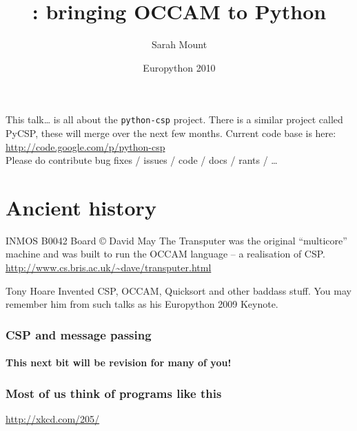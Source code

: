 \documentclass{beamer}
\title{\pythoncsp{}: bringing OCCAM to Python}
\author{Sarah Mount}
\date{Europython 2010}
\newcommand{\pythoncsp}{\texttt{python-csp}}
\begin{document}
\frame{\titlepage}

\frame{\tableofcontents}


\frame
{
  \begin{block}{This talk\ldots{}}
    is all about the \pythoncsp{} project. There is a
    similar project called PyCSP, these will merge over the next few
    months. Current code base is here:
    \url{http://code.google.com/p/python-csp} \\Please do contribute bug
    fixes / issues / code / docs / rants / \ldots{}
  \end{block}
}


\section{Ancient history}

\frame
{
\begin{block}{INMOS B0042 Board \copyright{} David May}
The Transputer was the original ``multicore'' machine and was built to
run the OCCAM language -- a realisation of CSP.
\url{http://www.cs.bris.ac.uk/~dave/transputer.html}\\
\end{block}
}


\frame
{
  \begin{block}{Tony Hoare}
    Invented CSP, OCCAM, Quicksort and other baddass stuff. You may
    remember him from such talks as his Europython 2009 Keynote.
  \end{block}
}





\frame
{
  \frametitle{CSP and message passing}
  \framesubtitle{This next bit will be revision for many of you!}
}


\frame
{
  \frametitle{Most of us think of programs like this}
  \begin{block}{}
  \url{http://xkcd.com/205/}    
  \end{block}
}
\end{document}
